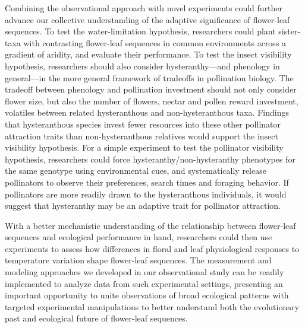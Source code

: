 \documentclass{article}[12pt]
\begin{document}
Combining the observational approach with novel experiments could further advance our collective understanding of the adaptive significance of flower-leaf sequences. To test the water-limitation hypothesis, researchers could plant sister-taxa with contrasting flower-leaf sequences in common environments across a gradient of aridity, and evaluate their performance. To test the insect visibility hypothesis, researchers should also consider hysteranthy---and phenology in general---in the more general framework of tradeoffs in pollination biology. The tradeoff between phenology and pollination investment should not only consider flower size, but also the number of flowers, nectar and pollen reward investment, volatiles between related hysteranthous and non-hysteranthous taxa. Findings that hysteranthous species invest fewer resources into these other pollinator attraction traits than non-hysteranthous relatives would support the insect visibility hypothesis. For a simple experiment to test the pollinator visibility hypothesis, researchers could force hysteranthy/non-hysteranthy phenotypes for the same genotype using environmental cues, and systematically release pollinators to observe their preferences, search times and foraging behavior. If pollinators are more readily drawn to the hysteranthous individuals, it would suggest that hysteranthy may be an adaptive trait for pollinator attraction. %

With a better mechanistic understanding of the relationship between flower-leaf sequences and ecological performance in hand, researchers could then use experiments to assess how differences in floral and leaf physiological responses to temperature variation shape flower-leaf sequences. The measurement and modeling approaches we developed in our observational study can be readily implemented to analyze data from such experimental settings, presenting an important opportunity to unite observations of broad ecological patterns with targeted experimental manipulations to better understand both the evolutionary past and ecological future of flower-leaf sequences.
\end{document}
